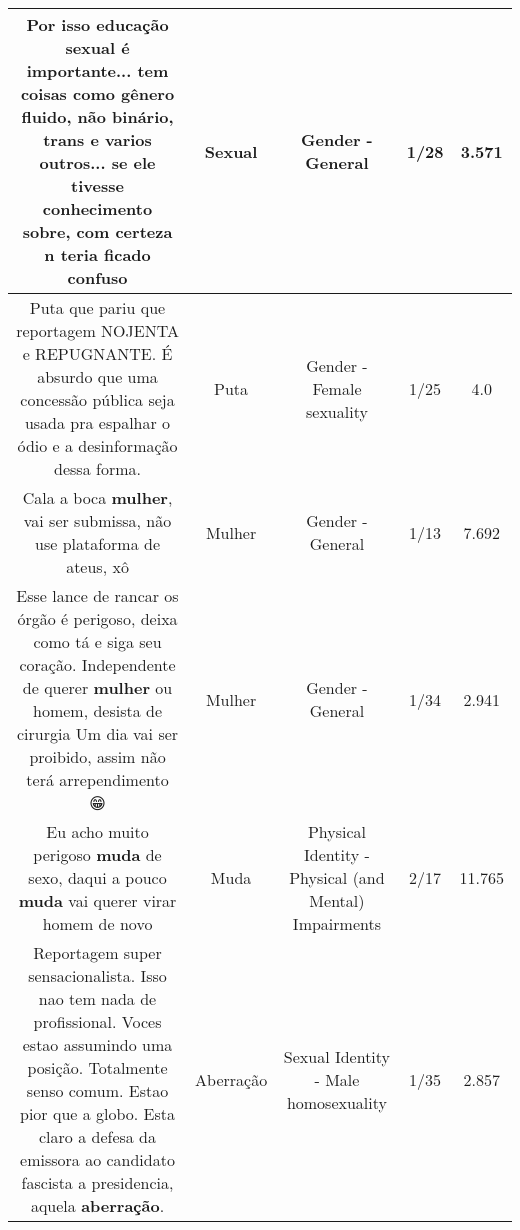 \documentclass[11pt]{article}
\newlength\mylength
\begin{document}
\begin{center}
\begin{longtable}{|C{.65\mylength}|C{.30\mylength}|C{.12\mylength}|C{.12\mylength}|C{.12\mylength}|}
  \small Por isso educação \textbf{sexual} é importante... tem coisas como gênero fluido, não binário, trans e varios outros... se ele tivesse conhecimento sobre, com certeza n teria ficado confuso\normalsize   & Sexual & Gender - General & 1/28 & 3.571 \\  \hline
  \small Puta que pariu que reportagem NOJENTA e REPUGNANTE. É absurdo que uma concessão pública seja usada pra espalhar o ódio e a desinformação dessa forma.\normalsize   & Puta & Gender - Female sexuality & 1/25 & 4.0 \\  \hline
  \small Cala a boca \textbf{mulher}, vai ser submissa, não use plataforma de ateus, xô\normalsize   & Mulher & Gender - General & 1/13 & 7.692 \\  \hline
  \small Esse lance de rancar os órgão é perigoso, deixa como tá e siga seu coração. Independente de querer \textbf{mulher} ou homem, desista de cirurgia Um dia vai ser proibido, assim não terá arrependimento 😁\normalsize   & Mulher & Gender - General & 1/34 & 2.941 \\  \hline
  \small Eu acho muito perigoso \textbf{muda} de sexo, daqui a pouco \textbf{muda} vai querer virar homem de novo\normalsize   & Muda & Physical Identity - Physical (and Mental) Impairments & 2/17 & 11.765 \\  \hline
  \small Reportagem super sensacionalista. Isso nao tem nada de profissional. Voces estao assumindo uma posição. Totalmente senso comum. Estao pior que a globo. Esta claro a defesa da emissora ao candidato fascista a presidencia, aquela \textbf{aberração}.\normalsize   & Aberração & Sexual Identity - Male homosexuality & 1/35 & 2.857 \\  \hline

\end{longtable}
\end{center}
\end{document}
